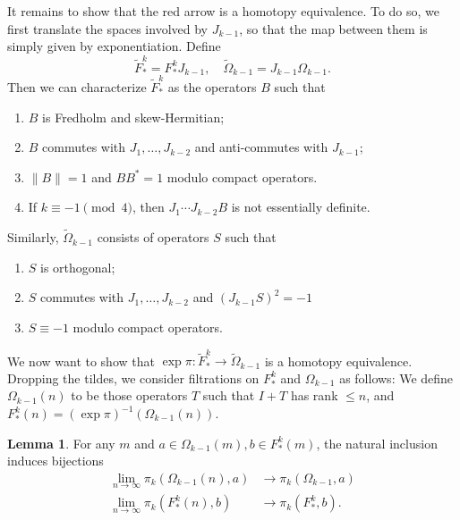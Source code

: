 \documentclass{shortart}
\theoremstyle{definition}
\newtheorem*{lemma}{Lemma}
\begin{document}
It remains to show that the red arrow is a homotopy equivalence. To do so, we first translate the spaces involved by $J_{k - 1}$, so that the map between them is simply given by exponentiation. Define
\[
  \tilde{F}^k_* = F^k_* J_{k - 1},\quad \tilde{\Omega}_{k - 1} = J_{k - 1} \Omega_{k - 1}.
\]
Then we can characterize $\tilde{F}^k_*$ as the operators $B$ such that
\begin{enumerate}
  \item $B$ is Fredholm and skew-Hermitian;
  \item $B$ commutes with $J_1, \ldots, J_{k - 2}$ and anti-commutes with $J_{k - 1}$;
  \item $\|B\| = 1$ and $BB^* = 1$ modulo compact operators.
  \item If $k \equiv -1 \pmod 4$, then $J_1 \cdots J_{k - 2} B$ is not essentially definite.
\end{enumerate}
Similarly, $\tilde{\Omega}_{k - 1}$ consists of operators $S$ such that
\begin{enumerate}
  \item $S$ is orthogonal;
  \item $S$ commutes with $J_1, \ldots, J_{k - 2}$ and $(J_{k - 1} S)^2 = -1$
  \item $S \equiv -1$ modulo compact operators.
\end{enumerate}

We now want to show that $\exp \pi: \tilde{F}_*^k \to \tilde{\Omega}_{k - 1}$ is a homotopy equivalence. Dropping the tildes, we consider filtrations on $F_*^k$ and $\Omega_{k - 1}$ as follows: We define $\Omega_{k - 1}(n)$ to be those operators $T$ such that $I + T$ has rank $\leq n$, and $F_*^k(n) = (\exp \pi)^{-1} (\Omega_{k - 1}(n))$.

\begin{lemma}
  For any $m$ and $a \in \Omega_{k - 1}(m), b \in F^k_*(m)$, the natural inclusion induces bijections
  \begin{align*}
    \lim_{n \to \infty} \pi_k(\Omega_{k - 1}(n), a) &\to \pi_k(\Omega_{k - 1}, a)\\
    \lim_{n \to \infty} \pi_k(F_*^k(n), b) &\to \pi_k(F_*^k, b).
  \end{align*}
\end{lemma}
\end{document}
